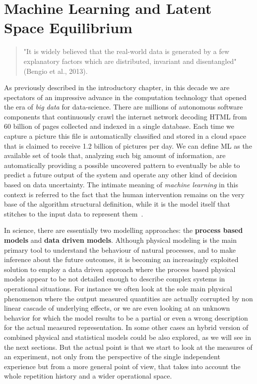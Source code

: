 \chapter{Machine Learning and Latent Space Equilibrium}
%
\begin{quote}
"It is widely believed that the real-world data is generated by a few explanatory factors which are distributed, invariant and disentangled" (Bengio et al., 2013).
\end{quote}
%
As previously described in the introductory chapter, in this decade we are spectators of an impressive advance in the computation technology that opened the era of \textit{big data} for data-science. There are millions of autonomous software components that continuously crawl the internet network decoding HTML from 60 billion of pages collected and indexed in a single database. Each time we capture a picture this file is automatically classified and stored in a cloud space that is claimed to receive 1.2 billion of pictures per day. 
%
We can define \acf{ML} as the available set of tools that, analyzing such big amount of information, are automatically providing a possible uncovered pattern to eventually be able to predict a future output of the system and operate any other kind of decision based on data uncertainty. The intimate meaning of \textit{machine learning} in this context is referred to the fact that the human intervention remains on the very base of the algorithm structural definition, while it is the model itself that stitches to the input data to represent them~\cite{murphy2013machine}.

In science, there are essentially two modelling approaches: the \textbf{process based models} and \textbf{data driven models}.
Although physical modeling is the main primary tool to understand the behaviour of natural processes, and to make inference about the future outcomes, it is becoming an increasingly exploited solution to employ a data driven approach where the process based physical models appear to be not detailed enough to describe complex systems in operational situations. For instance we often look at the sole main physical phenomenon where the output measured quantities are actually corrupted by non linear cascade of underlying effects, or we are even looking at an unknown behavior for which the model results to be a partial or even a wrong description for the actual measured representation. 
In some other cases an hybrid version of combined physical and statistical models could be also explored, as we will see in the next sections. But the actual point is that we start to look at the measures of an experiment, not only from the perspective of the single independent experience but from a more general point of view, that takes into account the whole repetition history and a wider operational space.  


